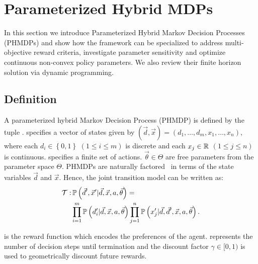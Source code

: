 \section{Parameterized Hybrid MDPs}
\label{sec:hybrid_mdps}

In this section we introduce Parameterized Hybrid Markov Decision Processes (PHMDPs) and show how the framework can be specialized to address multi-objective reward criteria, investigate parameter sensitivity and optimize continuous non-convex policy parameters. We also review their finite horizon solution via dynamic programming.

\subsection{Definition}
\label{sec:phmdp_def}

A parameterized hybrid Markov Decision Process (PHMDP) is defined by the tuple {\footnotesize \PMDPTuple}. {\footnotesize \State} specifies
a vector of states given by {\footnotesize $(\vec{d}, \vec{x}) =  \left( d_1, \ldots, d_m, x_1, \ldots, x_n \right) $}, where each {\footnotesize $ d_i \in \left\lbrace 0, 1 \right\rbrace $} {\footnotesize $\left( 1 \leq i \leq m \right)$} is discrete and each
{\footnotesize$ x_j \in \mathbb{R} $} {\footnotesize $\left( 1 \leq j \leq   n \right)$} is continuous. {\footnotesize \Action} specifies a
finite set of actions.  {\footnotesize $\vec{\theta} \in \Theta$} are free parameters from the parameter space {\footnotesize $ \Theta $}. PHMDPs are naturally factored~\parencite{Boutilier_JAIR_1999} in terms of the state variables {\footnotesize$\vec{d}$} and {\footnotesize
$\vec{x}$}. Hence, the joint transition model can be written as:
{\footnotesize
\abovedisplayskip=0pt
\belowdisplayskip=0pt
\begin{align}
    \label{eq:hmdp_tfunc}
    \mathcal{T} :& \, \mathbb{P}\left({\vec{d}', \vec{x}' | \vec{d}, \vec{x}, a, \vec{\theta}}\right) = \nonumber \\
    & \prod_{i=1}^{m} \mathbb{P}\left({d_i' | \vec{d}, \vec{x}, a, \vec{\theta}}\right) \prod_{j=1}^{n} \mathbb{P}\left({x_j' | \vec{d}, \vec{d}', \vec{x}, a, \vec{\theta}}\right).
\end{align}   
}

{\footnotesize \RewardFunc} is the reward function which encodes the preferences of the agent. {\footnotesize \Horizon} represents the
number of decision steps until termination and the discount factor {\footnotesize $\gamma \in [0, 1)$} is used to geometrically discount
future rewards.

